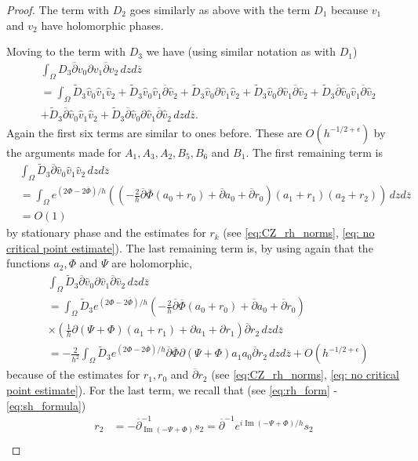 \documentclass[10pt,a4paper]{amsart}
\DeclareMathOperator {\Imm} {Im}
\newcommand {\p} {\partial}
\newcommand{\Om}{\Omega}
\newcommand{\dbar}{\ol{\p}}
\newcommand{\e}{\epsilon}
\newcommand{\ol}[1]{\overline{#1}}
\newcommand{\oz}{\overline{z}}
\begin{document}
\begin{proof}
	The term with $D_2$ goes similarly as above with the term $D_1$ because $v_1$ and $v_2$ have holomorphic phases.
	
	Moving to the term with $D_3$ we have (using similar notation as with $D_1$)
	\begin{align*}
		&\int_{\Om}D_3\dbar v_0 \p v_1\dbar v_2\,dzd\oz\\
		&= \int_{\Om}\tilde D_3\hat{v}_0\hat{v}_1\hat{v}_2 + \tilde D_3\hat{v}_0\hat{v}_1\dbar \hat{v}_2 + \tilde D_3\hat{v}_0\p \hat{v}_1\hat{v}_2 + \tilde D_3\hat{v}_0\p \hat{v}_1\dbar \hat{v}_2 + \tilde D_3\dbar \hat{v}_0\hat{v}_1\dbar \hat{v}_2\\
		&+ \tilde D_3\dbar \hat{v}_0\hat{v}_1\hat{v}_2 + \tilde D_3\dbar \hat{v}_0\p \hat{v}_1\dbar \hat{v}_2\,dzd\oz.
	\end{align*}
	Again the first six terms are similar to ones before. These are $O(h^{-1/2+\e})$ by the arguments made for $A_1, A_3, A_2, B_5, B_6$ and $B_1$. The first remaining term is
	\begin{align*}
		&\int_{\Om}\tilde D_3\dbar \hat{v}_0 \hat{v}_1\hat{v}_2\,dzd\oz\\
		&= \int_{\Om}e^{(2\Phi-2\ol{\Phi})/h}\left(\left(-\frac{2}{h}\dbar \ol{\Phi}(a_0 + r_0) + \dbar a_0 + \dbar r_0\right)(a_1+r_1)(a_2+r_2)\right)\,dzd\oz\\
		&= O(1)
	\end{align*}
	by stationary phase and the estimates for $r_k$ (see \eqref{eq:CZ_rh_norms}, \eqref{eq: no critical point estimate}). The last remaining term is, by using again that the functions $a_2, \Phi$ and $\Psi$ are holomorphic,
	\begin{align*}
		&\int_{\Om}\tilde D_3 \dbar \hat{v}_0\p \hat{v}_1\dbar \hat{v}_2\,dzd\oz\\
		&= \int_{\Om}\tilde D_3 e^{(2\Phi -2\ol{\Phi})/h}\left(-\frac{2}{h}\dbar\ol{\Phi}(a_0+r_0) + \dbar a_0 + \dbar r_0\right)\\
		&\times\left(\frac{1}{h}\p(\Psi+\Phi)(a_1+r_1) + \p a_1 + \p r_1\right)\dbar r_2\,dzd\oz\\
		&= -\frac{2}{h^2}\int_{\Om}\tilde D_3 e^{(2\Phi -2\ol{\Phi})/h}\dbar\ol{\Phi}\p(\Psi+\Phi)a_1a_0\dbar r_2\,dzd\oz + O(h^{-1/2+\e})
	\end{align*}
	because of the estimates for $r_1, r_0$ and $\dbar r_2$ (see \eqref{eq:CZ_rh_norms}, \eqref{eq: no critical point estimate}). For the last term, we recall that (see \eqref{eq:rh_form} - \eqref{eq:sh_formula})
	\begin{align*}
		r_2 &= - \dbar^{-1}_{\Imm(-\Psi + \Phi)}s_2 = \dbar^{-1}e^{i\Imm(-\Psi + \Phi)/h}s_2\\

\end{align*}
\end{proof}
\end{document}
